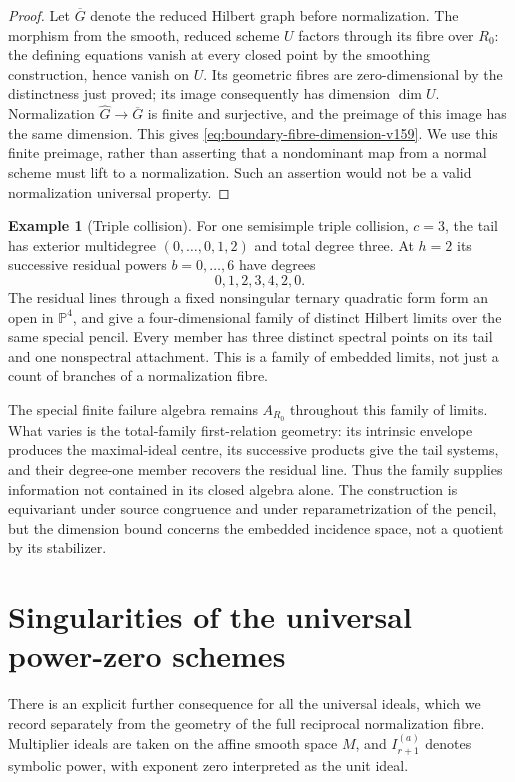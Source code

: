 \documentclass[11pt,reqno]{amsart}
\numberwithin{equation}{section}
\theoremstyle{definition}\newtheorem{definition}[theorem]{Definition}
\newtheorem{example}[theorem]{Example}
\theoremstyle{remark}\newtheorem{remark}[theorem]{Remark}
\newcommand{\Pj}{\mathbb P}\newcommand{\A}{\mathbb A}
\begin{document}
\begin{proof}
Let $\overline G$ denote the reduced Hilbert graph before normalization.
The morphism from the smooth, reduced scheme $U$ factors through its
fibre over $R_0$: the defining equations vanish at every closed point
by the smoothing construction, hence vanish on $U$. Its geometric
fibres are zero-dimensional by the distinctness just proved; its
image consequently has dimension $\dim U$. Normalization
$\widehat G\to\overline G$ is finite and surjective, and the preimage
of this image has the same dimension. This gives
\eqref{eq:boundary-fibre-dimension-v159}.
We use this finite preimage, rather than asserting that a nondominant
map from a normal scheme must lift to a normalization. Such an
assertion would not be a valid normalization universal property.
\end{proof}

\begin{example}[Triple collision]
\label{ex:triple-collision-v159}
For one semisimple triple collision, $c=3$, the tail has exterior
multidegree $(0,\ldots,0,1,2)$ and total degree three. At $h=2$ its
successive residual powers $b=0,\ldots,6$ have degrees
\[
                             0,1,2,3,4,2,0.
\]
The residual lines through a fixed nonsingular ternary quadratic
form form an open in $\Pj^4$, and give a four-dimensional family of
distinct Hilbert limits over the same special pencil. Every member
has three distinct spectral points on its tail and one nonspectral
attachment. This is a family of embedded limits, not just a count
of branches of a normalization fibre.
\end{example}

The special finite failure algebra remains $A_{R_0}$ throughout this
family of limits. What varies is the total-family first-relation
geometry: its intrinsic envelope produces the maximal-ideal centre,
its successive products give the tail systems, and their degree-one
member recovers the residual line. Thus the family supplies information
not contained in its closed algebra alone. The construction is
equivariant under source congruence and under reparametrization of the
pencil, but the dimension bound concerns the embedded incidence space,
not a quotient by its stabilizer.


\section{Singularities of the universal power-zero schemes}
\label{sec:power-multiplier-v157}
There is an explicit further consequence for all the universal ideals,
which we record separately from the geometry of the full reciprocal
normalization fibre. Multiplier ideals are taken on the affine smooth
space $M$, and $I_{r+1}^{(a)}$ denotes symbolic power, with exponent
zero interpreted as the unit ideal.
\end{document}
